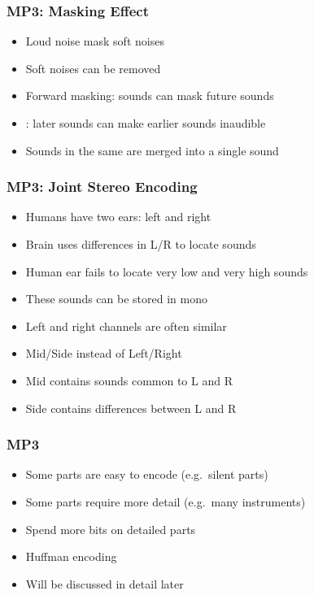 \documentclass{../ucll-slides}
\begin{document}
\begin{frame}
  \frametitle{MP3: Masking Effect}
  \begin{itemize}
    \item Loud noise mask soft noises
    \item Soft noises can be removed
    \item Forward masking: sounds can mask future sounds
    \item {}: later sounds can make earlier sounds inaudible
    \item Sounds in the same  are merged into a single sound
  \end{itemize}
\end{frame}

\begin{frame}
  \frametitle{MP3: Joint Stereo Encoding}
  \begin{itemize}
    \item Humans have two ears: left and right
    \item Brain uses differences in L/R to locate sounds
    \item Human ear fails to locate very low and very high sounds
    \item These sounds can be stored in mono
  \end{itemize}
  \vskip5mm
  \begin{itemize}
    \item Left and right channels are often similar
    \item Mid/Side instead of Left/Right
    \item Mid contains sounds common to L and R
    \item Side contains differences between L and R
  \end{itemize}
\end{frame}

\begin{frame}
  \frametitle{MP3}
  \begin{itemize}
    \item Some parts are easy to encode (e.g.\ silent parts)
    \item Some parts require more detail (e.g.\ many instruments)
    \item Spend more bits on detailed parts
  \end{itemize}
  \vskip5mm
  \begin{itemize}
    \item Huffman encoding
    \item Will be discussed in detail later
  \end{itemize}
\end{frame}
\end{document}
